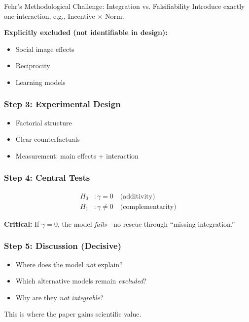 \begin{chapter}{Fehr's Methodological Challenge: Integration vs. Falsifiability}
Introduce exactly one interaction, e.g., Incentive $\times$ Norm.

\textbf{Explicitly excluded (not identifiable in design):}
\begin{itemize}[noitemsep]
    \item Social image effects
    \item Reciprocity
    \item Learning models
\end{itemize}

\subsubsection{Step 3: Experimental Design}

\begin{itemize}[noitemsep]
    \item Factorial structure
    \item Clear counterfactuals
    \item Measurement: main effects + interaction
\end{itemize}

\subsubsection{Step 4: Central Tests}

\begin{align}
H_0&: \gamma = 0 \quad \text{(additivity)} \\
H_1&: \gamma \neq 0 \quad \text{(complementarity)}
\end{align}

\textbf{Critical:} If $\gamma = 0$, the model \textit{fails}---no rescue through ``missing integration.''

\subsubsection{Step 5: Discussion (Decisive)}

\begin{itemize}[noitemsep]
    \item Where does the model \textit{not} explain?
    \item Which alternative models remain \textit{excluded}?
    \item Why are they \textit{not integrable}?
\end{itemize}

This is where the paper gains scientific value.


\end{chapter}
